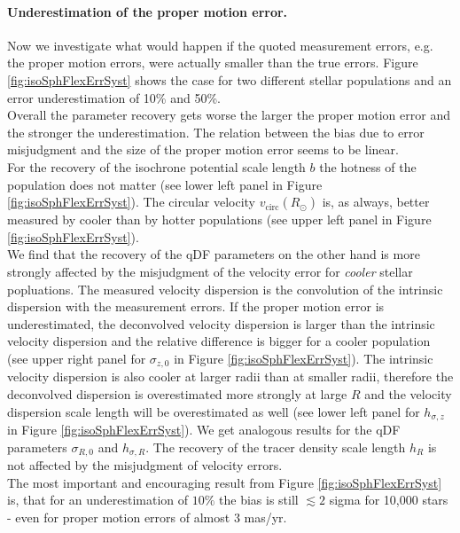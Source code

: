 \paragraph{Underestimation of the proper motion error.}  Now we investigate what would happen if the quoted measurement errors, e.g. the proper motion errors, were actually smaller than the true errors. Figure \ref{fig:isoSphFlexErrSyst} shows the case for two different stellar populations and an error underestimation of 10\% and 50\%. 
\\Overall the parameter recovery gets worse the larger the proper motion error and the stronger the underestimation. The relation between the bias due to error misjudgment and the size of the proper motion error seems to be linear.
\\For the recovery of the isochrone potential scale length $b$ the hotness of the population does not matter (see lower left panel in Figure \ref{fig:isoSphFlexErrSyst}). The circular velocity $v_\text{circ}(R_\odot)$ is, as always, better measured by cooler than by hotter populations (see upper left panel in Figure \ref{fig:isoSphFlexErrSyst}). 
\\We find that the recovery of the qDF parameters on the other hand is more strongly affected by the misjudgment of the velocity error for \emph{cooler} stellar popluations. The measured velocity dispersion is the convolution of the intrinsic dispersion with the measurement errors. If the proper motion error is underestimated, the deconvolved velocity dispersion is larger than the intrinsic velocity dispersion and the relative difference is bigger for a cooler population (see upper right panel for $\sigma_{z,0}$ in Figure \ref{fig:isoSphFlexErrSyst}). The intrinsic velocity dispersion is also cooler at larger radii than at smaller radii, therefore the deconvolved dispersion is overestimated more strongly at large $R$ and the velocity dispersion scale length will be overestimated as well (see lower left panel for $h_{\sigma,z}$ in Figure \ref{fig:isoSphFlexErrSyst}). We get analogous results for the qDF parameters $\sigma_{R,0}$ and $h_{\sigma,R}$. The recovery of the tracer density scale length $h_R$ is not affected by the misjudgment of velocity errors. 
\\The most important and encouraging result from Figure \ref{fig:isoSphFlexErrSyst} is, that for an underestimation of $10\%$ the bias is still $\lesssim 2$ sigma for 10,000 stars \Wilma{[TO DO: Check]} - even for proper motion errors of almost $3$ mas/yr.

